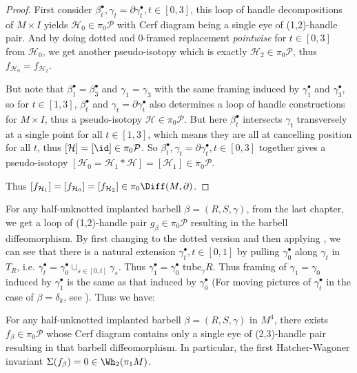 \begin{proof}
    First consider $\beta_t^\bullet, \gamma_t=\partial\gamma_t^\bullet,t\in[0,3]$, this loop of handle decompositions of $M\times I$ yields $\mathcal{H}_0\in \pi_0\mathcal{P}$ with Cerf diagram being a single eye of (1,2)-handle pair. And by doing dotted and 0-framed replacement \emph{pointwise} for $t\in [0,3]$ from $\mathcal{H}_0$, we get another pseudo-isotopy which is exactly $\mathcal{H}_2\in \pi_0\mathcal{P}$, thus $f_{\mathcal{H}_0}=f_{\mathcal{H}_2}$. 
    
   But note that $\beta_1^\bullet=\beta_3^\bullet$ and $\gamma_1=\gamma_3$ with the same framing induced by $\gamma_1^\bullet$ and $\gamma_3^\bullet$, so for $t\in [1,3]$, $\beta_t^\bullet$ and $\gamma_t=\partial\gamma_t^\bullet$ also determines a loop of handle constructions for $M\times I$, thus a pseudo-isotopy $\mathcal{H}\in \pi_0\mathcal{P}$. But here $\beta_t^\bullet$ intersects $\gamma_t$ transversely at a single point for all $t\in [1,3]$, which means they are all at cancelling position for all $t$, thus $[\mathcal{H}]=[\id]\in \pi_0\mathcal{P}$. So $\beta_t^\bullet, \gamma_t=\partial\gamma_t^\bullet,t\in[0,3]$ together gives a pseudo-isotopy $[\mathcal{H}_0=\mathcal{H}_1*\mathcal{H}]=[\mathcal{H}_1]\in \pi_0\mathcal{P}$.

   Thus $[f_{\mathcal{H}_1}]=[f_{\mathcal{H}_0}]=[f_{\mathcal{H}_2}]\in \pi_0\Diff(M,\partial)$.
\end{proof}

For any half-unknotted implanted barbell $\beta=(R,S,\gamma)$, from the last chapter, we get a loop of (1,2)-handle pair $g_\beta\in \pi_0\mathcal{P}$ resulting in the barbell diffeomorphism. By first changing to the dotted version and then applying  , we can see that there is a natural extension $\gamma_t^\bullet,t\in [0,1]$ by pulling $\gamma_0^\bullet$ along $\gamma_t$ in $T_R$, i.e. $\gamma_t^\bullet=\gamma_0^\bullet\cup_{s\in [0,t]} \gamma_s$. Thus $\gamma_1^\bullet=\gamma_0^\bullet \text{ tube}_{\gamma} R$. Thus framing of $ \gamma_1=\gamma_0$ induced by $\gamma_1^\bullet$ is the same as that induced by $\gamma_0^\bullet$ (For moving pictures of $\gamma_t^\bullet$ in the case of $\beta=\delta_k$, see ). Thus we have:

\begin{corollary} \label{cor:construction-of-fbeta}
    For any half-unknotted implanted barbell $\beta=(R,S,\gamma)$ in $M^4$, there exists $f_\beta\in \pi_0\mathcal{P}$ whose Cerf diagram contains only a single eye of (2,3)-handle pair resulting in that barbell diffeomorphism. In particular, the first Hatcher-Wagoner invariant $\Sigma(f_\beta)=0\in \Wh_2(\pi_1M)$.
\end{corollary}

